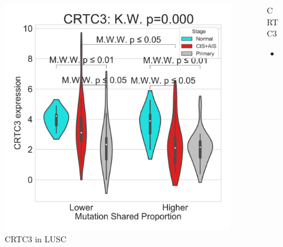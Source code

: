 \documentclass{beamer}
\begin{document}
\begin{frame}[allowframebreaks]
                    \begin{columns}
                        \begin{column}{0.4 \textwidth}
                            \begin{figure}
                                \includegraphics[width=\linewidth]{figures/DEG/Violin/STAR.TPM.SQC.MSP-Median.violin/Mutation Shared Proportion_CRTC3.pdf}
                                \caption{CRTC3 in LUSC}
                            \end{figure}
                        \end{column}
                        \begin{column}{0.55 \textwidth}
                            \begin{block}{CRTC3}
                                \begin{itemize}
                                    \item
                                \end{itemize}
                            \end{block}
                        \end{column}
                    \end{columns}


\end{frame}
\end{document}
